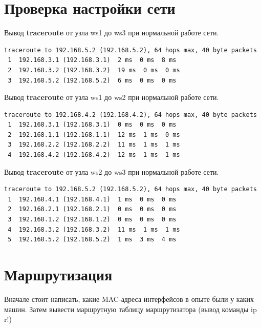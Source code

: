 \documentclass[a4paper,12pt]{article}
\begin{document}

\section{Проверка настройки сети}

Вывод \textbf{traceroute} от узла ws1 до ws3 при нормальной работе сети.

\begin{Verbatim}
traceroute to 192.168.5.2 (192.168.5.2), 64 hops max, 40 byte packets
 1  192.168.3.1 (192.168.3.1)  2 ms  0 ms  8 ms
 2  192.168.3.2 (192.168.3.2)  19 ms  0 ms  0 ms
 3  192.168.5.2 (192.168.5.2)  6 ms  0 ms  0 ms
\end{Verbatim}

Вывод \textbf{traceroute} от узла ws1 до ws2 при нормальной работе сети.

\begin{Verbatim}
traceroute to 192.168.4.2 (192.168.4.2), 64 hops max, 40 byte packets
 1  192.168.3.1 (192.168.3.1)  0 ms  0 ms  0 ms
 2  192.168.1.1 (192.168.1.1)  12 ms  1 ms  0 ms
 3  192.168.2.2 (192.168.2.2)  11 ms  1 ms  1 ms
 4  192.168.4.2 (192.168.4.2)  12 ms  1 ms  1 ms
\end{Verbatim}

Вывод \textbf{traceroute} от узла ws2 до ws3 при нормальной работе сети.

\begin{Verbatim}
traceroute to 192.168.5.2 (192.168.5.2), 64 hops max, 40 byte packets
 1  192.168.4.1 (192.168.4.1)  1 ms  0 ms  0 ms
 2  192.168.2.1 (192.168.2.1)  0 ms  0 ms  0 ms
 3  192.168.1.2 (192.168.1.2)  0 ms  0 ms  0 ms
 4  192.168.3.2 (192.168.3.2)  11 ms  1 ms  1 ms
 5  192.168.5.2 (192.168.5.2)  1 ms  3 ms  4 ms
\end{Verbatim}


\section{Маршрутизация}


Вначале стоит написать, какие MAC-адреса интерфейсов в опыте были у каких машин.
Затем вывести маршрутную таблицу маршрутизатора (вывод команды ip r!)
\end{document}
